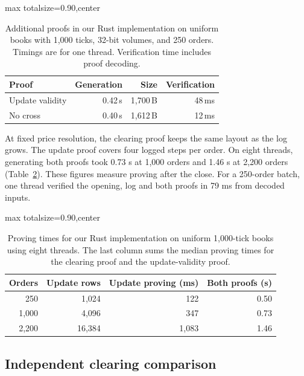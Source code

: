 \begin{table}[!tp]
\centering
\caption{Additional proofs in our Rust implementation on uniform books with
1,000 ticks, 32-bit volumes, and 250 orders. Timings are for one thread.
Verification time includes proof decoding.}
\label{tab:rust-additional-proofs}
\setlength{\tabcolsep}{3pt}
\begin{adjustbox}{max totalsize={\linewidth}{0.90\textheight},center}
\begin{tabular}{@{}lrrr@{}}
\toprule
Proof & Generation & Size & Verification \\
\midrule
Update validity & 0.42\,s & 1,700\,B & 48\,ms \\
No cross        & 0.40\,s & 1,612\,B & 12\,ms \\
\bottomrule
\end{tabular}
\end{adjustbox}
\end{table}

At fixed price resolution, the clearing proof keeps the same layout as the log grows. The update proof covers four logged steps per order. On eight threads, generating both proofs took 0.73 s at 1,000 orders and 1.46 s at 2,200 orders (Table~\ref{tab:rust-proving-by-order-count}). These figures measure proving after the close. For a 250-order batch, one thread verified the opening, log and both proofs in 79 ms from decoded inputs.

\begin{table}[!tp]
\centering
\caption{Proving times for our Rust implementation on uniform 1,000-tick
books using eight threads. The last column sums the median proving times
for the clearing proof and the update-validity proof.}
\label{tab:rust-proving-by-order-count}
\setlength{\tabcolsep}{3pt}
\begin{adjustbox}{max totalsize={\linewidth}{0.90\textheight},center}
\begin{tabular}{@{}rrrr@{}}
\toprule
Orders & Update rows & Update proving (ms) & Both proofs (s) \\
\midrule
  250 &  1,024 &   122 & 0.50 \\
1,000 &  4,096 &   347 & 0.73 \\
2,200 & 16,384 & 1,083 & 1.46 \\
\bottomrule
\end{tabular}
\end{adjustbox}
\end{table}

\subsection{Independent clearing comparison}
\label{sec:zq-comparison}

